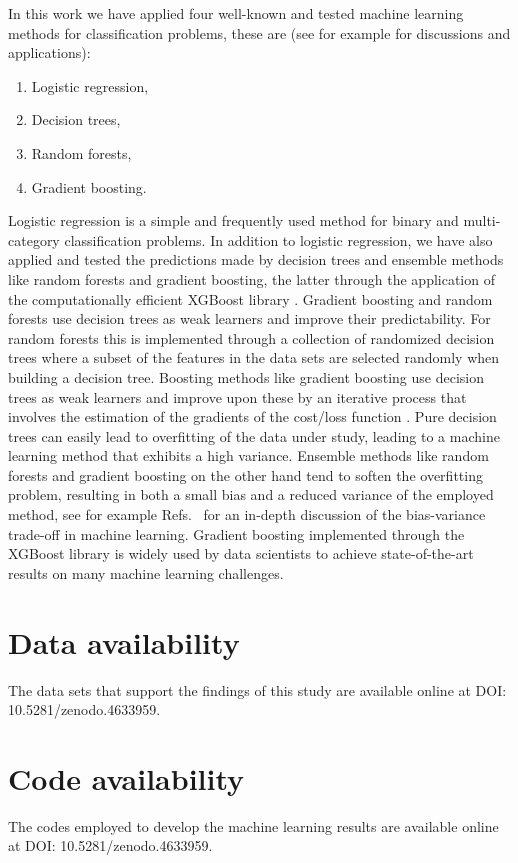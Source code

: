 \documentclass[superscriptaddress,unsortedaddress,
 amsmath,amssymb,
 aps,
]{revtex4-2}
\begin{document}
In this work we have applied four well-known and tested machine learning methods for classification problems, these are (see for example \cite{Hastie2009,Mehta2019} for discussions and applications):
\begin{enumerate}
    \item Logistic regression,
    \item Decision trees,
    \item Random forests,
    \item Gradient boosting.
\end{enumerate}
Logistic regression \cite{Hastie2009} is a simple and frequently used method for binary and multi-category classification problems. In addition to logistic regression, we have also applied and tested the predictions made by decision trees and ensemble methods like random forests and gradient boosting, the latter through the application of the computationally efficient  XGBoost library \cite{xgboost2016}. Gradient boosting and random forests use decision trees as weak learners and improve their predictability. For random forests this is implemented through a collection of randomized decision trees where a  subset of the features in the data sets are selected randomly when building a decision tree. Boosting methods like gradient boosting use decision trees as  weak learners and improve upon these by an iterative process that involves the estimation of the gradients of the cost/loss function \cite{Hastie2009}. Pure decision trees can easily lead to overfitting of the data under study, leading to a machine learning method that exhibits a high variance. Ensemble methods like random forests and gradient boosting on the other hand tend to soften the overfitting problem, resulting in both a small bias and a reduced variance of the employed method, see for example Refs.~\cite{Hastie2009,Mehta2019} for an in-depth discussion of the bias-variance trade-off in machine learning. Gradient boosting implemented through the  XGBoost library \cite{xgboost2016} is widely used by data scientists to achieve state-of-the-art results on many machine learning challenges. 

\section*{Data availability} 
The data sets that support the findings of this study are available online at DOI: 10.5281/zenodo.4633959.  

\section*{Code availability} 
The codes employed to develop the machine learning results are available online at 
DOI: 10.5281/zenodo.4633959. 
\end{document}
